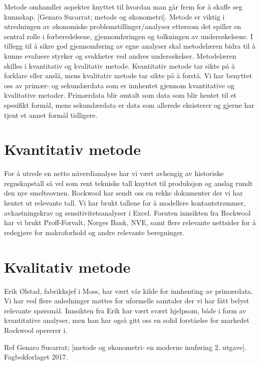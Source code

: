 Metode omhandler aspekter knyttet til hvordan man går frem for å skaffe seg kunnskap. [Genaro Sucarrat; metode og økonometri].
\indent \newline
Metode er viktig i utredningen av økonomiske problemstillinger/analyser ettersom det spiller en sentral rolle i forberedelsene, gjennomføringen og tolkningen av undersøkelsene. I tillegg til å sikre god gjennomføring av egne analyser skal metodelæren bidra til å kunne evaluere styrker og svakheter ved andres undersøkelser. Metodelæren skilles i kvantitativ og kvalitativ metode. Kvantitativ metode tar sikte på å forklare eller anslå, mens kvalitativ metode tar sikte på å forstå.
Vi har benyttet oss av primær- og sekundærdata som er innhentet gjennom kvantitative og kvalitative metoder. Primærdata blir omtalt som data som blir hentet til et spesifikt formål, mens sekundærdata er data som allerede eksisterer og gjerne har tjent et annet formål tidligere.
 
\section{Kvantitativ metode}
For å utrede en netto nåverdianalyse har vi vært avhengig av historiske regnskapstall så vel som rent tekniske tall knyttet til produksjon og anslag rundt den nye smelteovnen. Rockwool har sendt oss en rekke dokumenter der vi har hentet ut relevante tall. Vi har brukt tallene for å modellere kontantstrømmer, avkastningskrav og sensitivitetsanalyser i Excel. Foruten innsikten fra Rockwool har vi brukt Proff-Forvalt, Norges Bank, NVE, samt flere relevante nettsider for å redegjøre for makroforhold og andre relevante beregninger.
 
\section{Kvalitativ metode}
Erik Ølstad, fabrikksjef i Moss, har vært vår kilde for innhenting av primærdata. Vi har ved flere anledninger møttes for uformelle samtaler der vi har fått belyst relevante spørsmål. Innsikten fra Erik har vært svært hjelpsom, både i form av kvantitative analyser, men han har også gitt oss en solid forståelse for markedet Rockwool opererer i.   
 
\indent \newline
Ref Genaro Sucarrat; [metode og økonometri- en moderne innføring 2. utgave]. Fagbokforlaget 2017.
